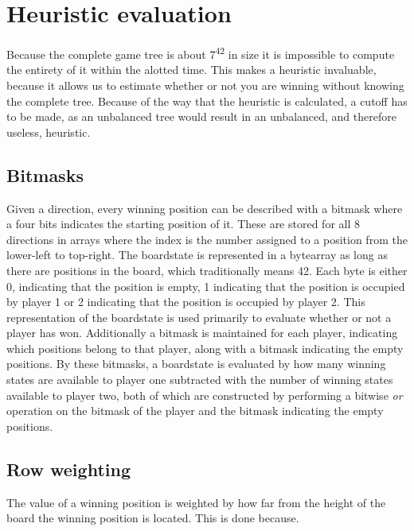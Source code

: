 \section{Heuristic evaluation}

Because the complete game tree is about 7\textsuperscript{42} in size it is impossible to compute the entirety of it within the alotted time. This makes a heuristic invaluable, because it allows us to estimate whether or not you are winning without knowing the complete tree. Because of the way that the heuristic is calculated, a cutoff has to be made, as an unbalanced tree would result in an unbalanced, and therefore useless, heuristic.

\subsection{Bitmasks}

Given a direction, every winning position can be described with a bitmask where a four bits indicates the starting position of it. These are stored for all 8 directions in arrays where the index is the number assigned to a position from the lower-left to top-right. 
The boardstate is represented in a bytearray as long as there are positions in the board, which traditionally means 42. Each byte is either 0, indicating that the position is empty, 1 indicating that the position is occupied by player 1 or 2 indicating that the position is occupied by player 2. This representation of the boardstate is used primarily to evaluate whether or not a player has won.
Additionally a bitmask is maintained for each player, indicating which positions belong to that player, along with a bitmask indicating the empty positions. By these bitmasks, a boardstate is evaluated by how many winning states are available to player one subtracted with the number of winning states available to player two, both of which are constructed by performing a bitwise \emph{or} operation on the bitmask of the player and the bitmask indicating the empty positions.

\subsection{Row weighting}

The value of a winning position is weighted by how far from the height of the board the winning position is located. This is done because.